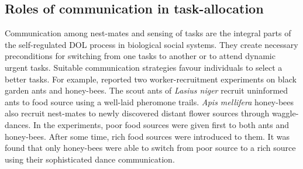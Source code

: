 \subsection{Roles of communication in task-allocation}
\label{bg:bio-comm:comm-role}
Communication among nest-mates and sensing of tasks are the integral parts of the self-regulated DOL process in biological social systems. They create necessary  preconditions for switching from one tasks to another or to attend dynamic urgent tasks. Suitable communication strategies favour individuals to select a better tasks. For example,  reported two worker-recruitment experiments on black garden ants and honey-bees. The scout ants of {\em Lasius niger}  recruit uninformed ants to food source using a well-laid pheromone trails. {\em Apis mellifera} honey-bees also recruit nest-mates to newly discovered distant flower sources through waggle-dances. In the experiments,  poor food sources were given first to both ants and honey-bees. After some time,  rich food sources were introduced  to them. It was found that only honey-bees were able to switch from poor source to a rich source using their sophisticated dance communication.

